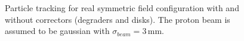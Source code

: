 \begin{figure}[!h]
	\begin{center}
		
	\end{center}
	\caption[Particle tracking for real symmetric field configuration with and without correctors]{Particle tracking for real symmetric field configuration with and without correctors (degraders and disks). The proton beam is assumed to be gaussian with $\sigma_{beam}=3\,\mathrm{mm}$.}
	\label{chap3:SymTransversalProfile}
\end{figure}
